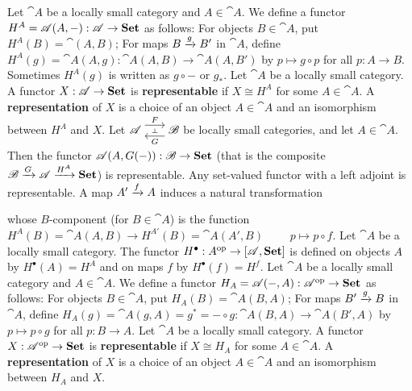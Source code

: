  Let $\cat A $ be a locally small category and $A \in \cat A$. We define a functor $H^A = \mathscr{A}(A, -): \mathscr{A} \to \operatorname{\mathbf{Set}}$ as follows:
For objects $B \in \cat A$, put $H^A(B) = \cat(A,B)$; 
For maps $B \xrightarrow[]{g} B'$ in $\cat A$, define $H^A(g) = \cat A(A,g): \cat A(A,B) \to \cat A(A, B')$ by $p \mapsto g \circ p$ for all $p: A \to B$. Sometimes $H^A(g)$ is written as $g \circ -$ or $g_*$.
 Let $\cat A$ be a locally small category. A functor $X: \mathscr{A} \to \operatorname{\mathbf{Set}}$ is \textbf{representable} if $X \cong H^A$ for some $A \in \cat A$. A \textbf{representation} of $X$ is a choice of an object $A \in \cat A$ and an isomorphism between $H^A$ and $X$.
 Let $\cat{A} \ladj{F}{G} \cat{B}$ be locally small categories, and let $A \in \cat A$. Then the functor $\mathscr{A}(A, G(-)): \mathscr{B} \to \operatorname{\mathbf{Set}}$ (that is the composite $\mathscr{B} \xrightarrow[]{G} \mathscr{A} \xrightarrow[]{H^A} \operatorname{\mathbf{Set}}$) is representable.
 Any set-valued functor with a left adjoint is representable.
 A map $A' \xrightarrow[]{f} A$ induces a natural transformation %
 whose $B$-component (for $B \in \cat A$) is the function $H^A(B) = \cat{A}(A,B) \to H^{A'}(B) = \cat{A}(A',B)\qquad$ $p \mapsto p \circ f$. 
 Let $\cat A$ be a locally small category. The functor $H^\bullet: A^{\operatorname{op}} \to [\mathscr{A}, \operatorname{\mathbf{Set}}]$ is defined on objects $A$ by $H^\bullet (A) = H^A$ and on maps $f$ by $H^\bullet(f) = H^f$.
 Let $\cat A$ be a locally small category and $A \in \cat A$. We define a functor $H_A = \mathscr{A} (-,A):\mathscr{A}^{\operatorname{op}} \to \operatorname{\mathbf{Set}}$ as follows:
For objects $B \in \cat A$, put $H_A(B) = \cat A(B,A)$; 
For maps $B' \xrightarrow[]{g} B$ in $\cat A$, define $H_A(g) = \cat A (g,A) = g^* = - \circ g : \cat A(B,A) \to \cat A (B', A)$ by $p \mapsto p \circ g$ for all $p : B \to A$.
 Let $\cat A$ be a locally small category. A functor $X: \mathscr{A}^{\operatorname{op}} \to \operatorname{\mathbf{Set}}$ is \textbf{representable} if $X \cong H_A$ for some $A \in \cat A$. A \textbf{representation} of $X$ is a choice of an object $A \in \cat A$ and an isomorphism between $H_A$ and $X$.
